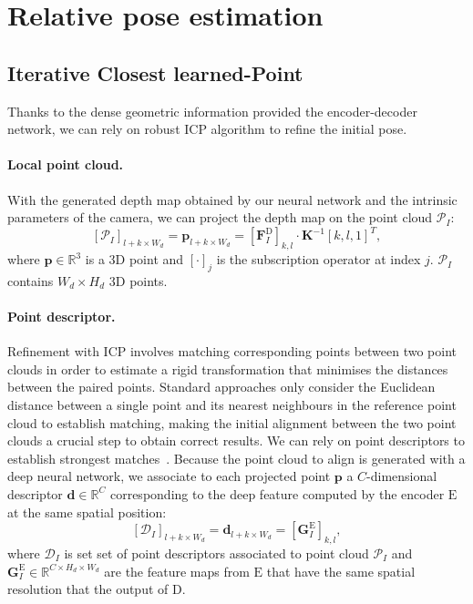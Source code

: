 \section{Relative pose estimation}
\label{sec:relative_pose}

\subsection{Iterative Closest learned-Point}

\label{subsec:pc_alignment}
Thanks to the dense geometric information provided the encoder-decoder network, we can rely on robust ICP algorithm to refine the initial pose. 

\paragraph{Local point cloud.}
With the generated depth map obtained by our neural network and the intrinsic parameters of the camera, we can project the depth map on the point cloud $\mathcal{P}_{I}$:
\begin{equation}
	\left[\mathcal{P}_{I}\right]_{l + k\times W_d} = \mathbf{p}_{l + k\times W_d} = \left[\mathbf{F}^{\mathrm{D}}_I\right]_{k,l} \cdot \mathbf{K}^{-1}[k, l, 1]^T,
\end{equation}
where $\mathbf{p}\in\mathbb{R}^{3}$ is a 3D point and $\left[\cdot\right]_j$ is the subscription operator at index $j$. $\mathcal{P}_{I}$ contains $W_d \times H_d$ 3D points.

\paragraph{Point descriptor.}
Refinement with ICP involves matching corresponding points between two point clouds in order to estimate a rigid transformation that minimises the distances between the paired points. Standard approaches only consider the Euclidean distance between a single point and its nearest neighbours in the reference point cloud to establish matching, making the initial alignment between the two point clouds a crucial step to obtain correct results. We can rely on point descriptors to establish strongest matches~\cite{Pomerleau2015}. Because the point cloud to align is generated with a deep neural network, we associate to each projected point $\mathbf{p}$ a $C$-dimensional descriptor $\mathbf{d}\in\mathbb{R}^{C}$ corresponding to the deep feature computed by the encoder $\mathrm{E}$ at the same spatial position:
\begin{equation}
	\left[ \mathcal{D}_{I} \right]_{l + k\times W_d} =  \mathbf{d}_{l + k\times W_d} = \left[ \mathbf{G}^{\mathrm{E}}_{I} \right]_{k, l},
\end{equation}
where $\mathcal{D}_{I}$ is set set of point descriptors associated to point cloud $\mathcal{P}_{I}$ and $\mathbf{G}^{\mathrm{E}}_{I} \in\mathbb{R}^{C\times H_d\times W_d}$ are the feature maps from $\mathrm{E}$ that have the same spatial resolution that the output of $\mathrm{D}$.

